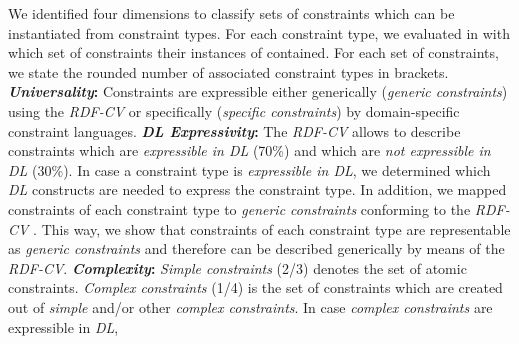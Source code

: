 \documentclass[a4paper,fontsize=11pt]{scrartcl}
\begin{document}
We identified four dimensions to classify sets of constraints which can be instantiated from constraint types.
For each constraint type, we evaluated \cite{BoschNolleAcarEckert2015} in with which set of constraints their instances of contained.
For each set of constraints, we state the rounded number of associated constraint types in brackets.
\textbf{\emph{Universality}:}
Constraints are expressible either generically (\emph{generic constraints}) using the \emph{RDF-CV}   
or specifically (\emph{specific constraints}) by domain-specific constraint languages. 
\textbf{\emph{DL Expressivity}:}
The \emph{RDF-CV} allows to describe 
constraints which are \emph{expressible in DL} (70\%) and which are \emph{not expressible in DL} (30\%). 
In case a constraint type is \emph{expressible in DL}, we determined which \emph{DL} constructs are needed to express the constraint type.
In addition, we mapped constraints of each constraint type to \emph{generic constraints} conforming to the \emph{RDF-CV} \cite{BoschNolleAcarEckert2015}.
This way, we show that constraints of each constraint type are representable as \emph{generic constraints} and therefore can be described generically by means of the \emph{RDF-CV}.
\textbf{\emph{Complexity}:}
\emph{Simple constraints} (2/3) denotes the set of atomic constraints. 
\emph{Complex constraints} (1/4) is the set of constraints which are created out of \emph{simple} and/or other \emph{complex constraints}.
In case \emph{complex constraints} are expressible in \emph{DL}, 
\end{document}
